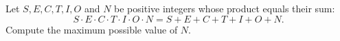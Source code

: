 Let $S,E,C,T,I,O$ and $N$ be positive integers whose product equals their sum:
\[S\cdot E\cdot C\cdot T\cdot I\cdot O\cdot N=S+E+C+T+I+O+N.\]
Compute the maximum possible value of $N$.
